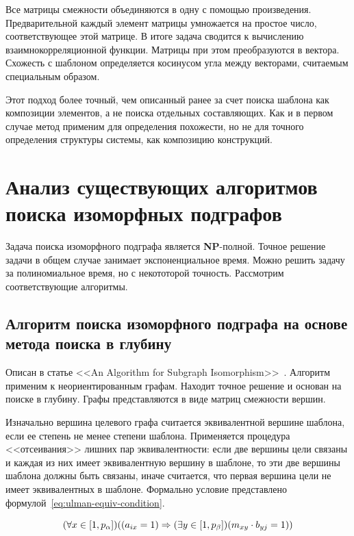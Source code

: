 Все матрицы смежности объединяются в одну с помощью произведения.
Предварительной каждый элемент матрицы умножается на простое число,
соответствующее этой матрице.
В итоге задача сводится к вычислению взаимнокорреляционной функции.
Матрицы при этом преобразуются в вектора.
Схожесть с шаблоном определяется косинусом угла между векторами,
считаемым специальным образом.

Этот подход более точный, чем описанный ранее за счет поиска шаблона как композиции
элементов, а не поиска отдельных составляющих.
Как и в первом случае метод применим для определения похожести,
но не для точного определения структуры системы, как композицию конструкций.

\section{Анализ существующих алгоритмов поиска изоморфных подграфов}

Задача поиска изоморфного подграфа является \textbf{NP}-полной.
Точное решение задачи в общем случае занимает экспоненциальное время.
Можно решить задачу за полиномиальное время, но с некототорой точность.
Рассмотрим соответствующие алгоритмы.

\subsection{Алгоритм поиска изоморфного подграфа на основе метода поиска в глубину}

Описан в статье <<An Algorithm for Subgraph Isomorphism>>~\cite{SubgraphIsomorphism}.
Алгоритм применим к неориентированным графам.
Находит точное решение и основан на поиске в глубину.
Графы представляются в виде матриц смежности вершин.

Изначально вершина целевого графа считается эквивалентной вершине шаблона, если
ее степень не менее степени шаблона.
Применяется процедура <<отсеивания>> лишних пар эквивалентности:
если две вершины цели связаны и каждая из них имеет эквивалентную вершину в шаблоне,
то эти две вершины шаблона должны быть связаны, иначе считается, что первая
вершина цели не имеет эквивалентных в шаблоне.
Формально условие представлено формулой~\ref{eq:ulman-equiv-condition}.

\begin{equation} \label{eq:ulman-equiv-condition}
(\forall x \in [1, p_\alpha]) ( (a_{ix} = 1) \Rightarrow (\exists y \in [1, p_\beta]) (m_{xy} \cdot b_{yj} = 1) )
\end{equation}

